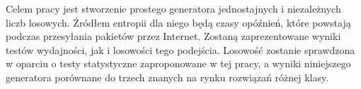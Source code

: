 \begin{streszczenie}
Celem pracy jest stworzenie prostego generatora jednostajnych i niezależnych liczb losowych. Źródłem entropii dla niego będą czasy opóźnień, które powstają podczas przesyłania pakietów przez Internet. Zostaną zaprezentowane wyniki testów wydajności, jak i losowości tego podejścia. Losowość zostanie sprawdzona w oparciu o testy statystyczne zaproponowane w tej pracy, a wyniki niniejszego generatora porównane do trzech znanych na rynku rozwiązań różnej klasy.
\end{streszczenie}
